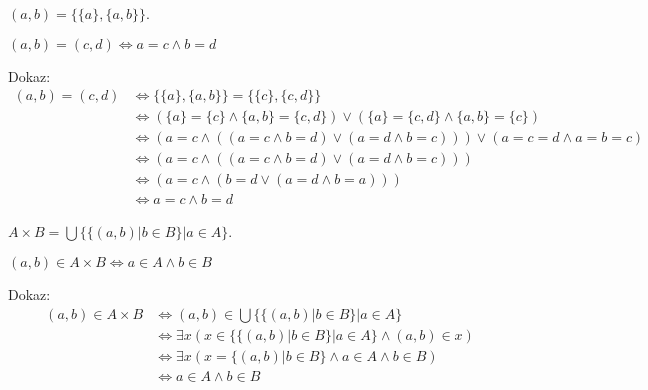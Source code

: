 \begin{definicija}
    $(a, b) = \{\{a\},\{a,b\}\}$.
\end{definicija}

\begin{trditev}
    $(a, b) = (c, d) \iff a = c \wedge b = d$
\end{trditev}
Dokaz:
\begin{align*}
    (a, b) = (c, d) &\iff \{\{a\},\{a,b\}\} = \{\{c\},\{c,d\}\} \\
    &\iff (\{a\} = \{c\} \wedge \{a,b\} = \{c,d\}) \vee (\{a\} = \{c,d\} \wedge \{a,b\} = \{c\}) \\
    &\iff (a = c \wedge ((a = c \wedge b = d) \vee (a = d \wedge b = c))) \vee (a = c = d \wedge a = b = c) \\
    &\iff (a = c \wedge ((a = c \wedge b = d) \vee (a = d \wedge b = c))) \\
    &\iff (a = c \wedge (b = d \vee (a = d \wedge b = a))) \\
    &\iff a = c \wedge b = d
\end{align*}

\begin{definicija}
    $A \times B = \bigcup\{\{(a,b) | b \in B\} | a \in A\}$.
\end{definicija}

\begin{trditev}
    $(a, b) \in A \times B \iff a \in A \wedge b \in B$
\end{trditev}

Dokaz:
\begin{align*}
    (a, b) \in A \times B &\iff (a, b) \in \bigcup\{\{(a,b) | b \in B\} | a \in A\} \\
    &\iff \exists x (x \in \{\{(a,b) | b \in B\} | a \in A\} \wedge (a, b) \in x) \\
    &\iff \exists x (x = \{(a,b) | b \in B\} \wedge a \in A \wedge b \in B) \\
    &\iff a \in A \wedge b \in B
\end{align*}
